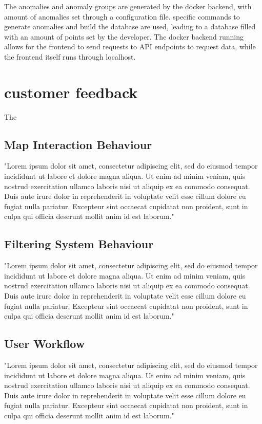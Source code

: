 The anomalies and anomaly groups are generated by the docker backend, with amount of anomalies set through a configuration file. specific commands to generate anomalies and build the database are used, leading to a database filled with an amount of points set by the developer. The docker backend running allows for the frontend to send requests to API endpoints to request data, while the frontend itself runs through localhost. 

\section{customer feedback}
The 

\subsection{Map Interaction Behaviour}

"Lorem ipsum dolor sit amet, consectetur adipiscing elit, sed do eiusmod tempor incididunt ut labore et dolore magna aliqua. Ut enim ad minim veniam, quis nostrud exercitation ullamco laboris nisi ut aliquip ex ea commodo consequat. Duis aute irure dolor in reprehenderit in voluptate velit esse cillum dolore eu fugiat nulla pariatur. Excepteur sint occaecat cupidatat non proident, sunt in culpa qui officia deserunt mollit anim id est laborum."

\subsection{Filtering System Behaviour}

"Lorem ipsum dolor sit amet, consectetur adipiscing elit, sed do eiusmod tempor incididunt ut labore et dolore magna aliqua. Ut enim ad minim veniam, quis nostrud exercitation ullamco laboris nisi ut aliquip ex ea commodo consequat. Duis aute irure dolor in reprehenderit in voluptate velit esse cillum dolore eu fugiat nulla pariatur. Excepteur sint occaecat cupidatat non proident, sunt in culpa qui officia deserunt mollit anim id est laborum."

\subsection{User Workflow}

"Lorem ipsum dolor sit amet, consectetur adipiscing elit, sed do eiusmod tempor incididunt ut labore et dolore magna aliqua. Ut enim ad minim veniam, quis nostrud exercitation ullamco laboris nisi ut aliquip ex ea commodo consequat. Duis aute irure dolor in reprehenderit in voluptate velit esse cillum dolore eu fugiat nulla pariatur. Excepteur sint occaecat cupidatat non proident, sunt in culpa qui officia deserunt mollit anim id est laborum."


